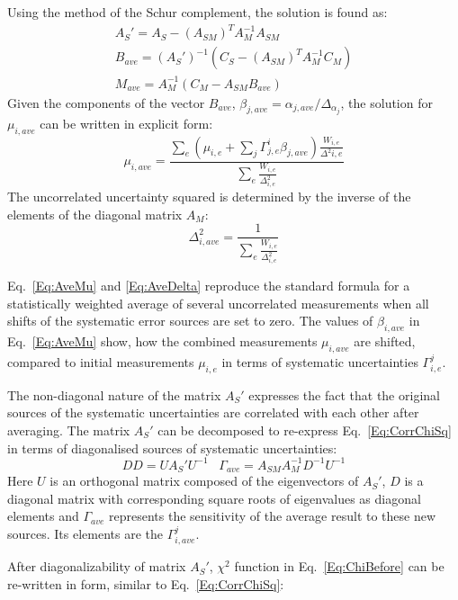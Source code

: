 Using the method of the Schur complement, the solution is found as:
\begin{eqnarray}
A_S' = A_S - (A_{SM})^T A_M^{-1} A_{SM} \nonumber  \\
B_{ave} = (A_S')^{-1} (C_S - (A_{SM})^T A_M^{-1} C_M) \nonumber  \\
M_{ave} = A_M^{-1} (C_M - A_{SM} B_{ave})
\end{eqnarray}
Given the components of the vector $B_{ave}$,  $\beta_{j, ave} = \alpha_{j,ave}/\Delta_{\alpha_j}$, the solution for $\mu_{i, ave}$ can be written in explicit form:
\begin{equation}
\mu_{i, ave} = \frac{\sum_e \left(\mu_{i,e} + \sum_j \Gamma^i_{j,e} \beta_{j,ave} \right)
\frac{W_{i,e}}{\Delta^2{i,e}} }{\sum_e \frac{W_{i,e}}{\Delta^2_{i,e}}}
\label{Eq:AveMu}
\end{equation}
The uncorrelated uncertainty squared is determined by the inverse of the elements of the diagonal matrix $A_M$:
\begin{equation}
\Delta^2_{i,ave} = \frac{1}{\sum_e \frac{W_{i,e}}{\Delta^2_{i,e}}}
\label{Eq:AveDelta}
\end{equation}

Eq.~\ref{Eq:AveMu} and \ref{Eq:AveDelta} reproduce the standard formula for a statistically weighted average of several uncorrelated measurements when all shifts of the systematic error sources are set to zero. The values of $\beta_{i, ave}$ in Eq.~\ref{Eq:AveMu} show, how the combined measurements $\mu_{i, ave}$ are shifted, compared to initial measurements $\mu_{i,e}$ in terms of systematic uncertainties $\Gamma^j_{i,e}$.

The non-diagonal nature of the matrix $A_S'$ expresses the fact that the original sources of the systematic uncertainties are correlated with each other after averaging. The matrix $A_S'$ can be decomposed to re-express Eq.~\ref{Eq:CorrChiSq} in terms of diagonalised sources of systematic uncertainties:
\begin{equation}
DD = UA_S' U^{-1} \; \; \; \Gamma_{ave} = A_{SM} A_M^{-1} D^{-1} U^{-1}
\label{Eq:Diag}
\end{equation}
Here $U$ is an orthogonal matrix composed of the eigenvectors of $A_S'$, $D$ is a diagonal matrix with corresponding square roots of eigenvalues as diagonal elements and $\Gamma_{ave}$ represents the sensitivity of the average result to these new sources. Its elements are the $\Gamma_{i,ave}^j$.

After diagonalizability of matrix $A_S'$, $\chi^2$ function in Eq.~\ref{Eq:ChiBefore} can be re-written in form, similar to Eq.~\ref{Eq:CorrChiSq}:

